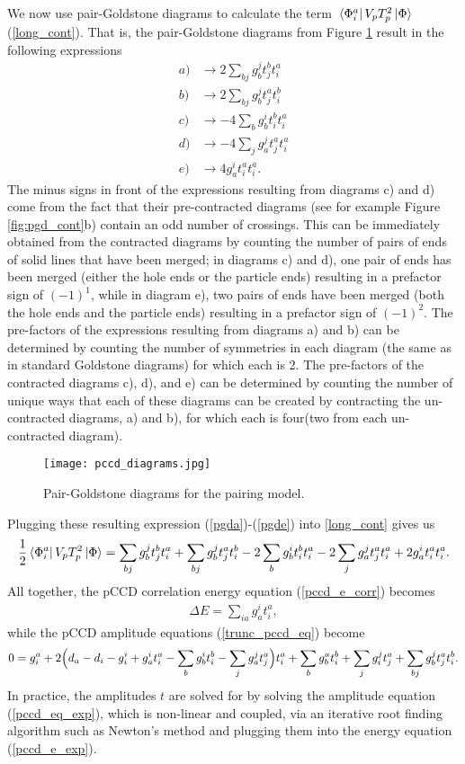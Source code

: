 \documentclass[Dual]{msu-thesis}
\begin{document}
We now use pair-Goldstone diagrams to calculate the term $\bra*{\Phi^a_i}V_pT^2_p\ket{\Phi}$ (\ref{long_cont}). That is, the pair-Goldstone diagrams from Figure \ref{fig:pgd} result in the following expressions
\begin{align}
\label{pgda}
a) &\to  2\sum_{bj}g^j_bt^b_jt^a_i
\\
b) &\to  2\sum_{bj}g^j_bt^a_jt^b_i
\\
c) &\to -4\sum_{b}g^i_bt^b_it^a_i
\\
d) &\to -4\sum_{j}g^j_at^a_jt^a_i
\\
\label{pgde}
e) &\to  4g^i_at^a_it^a_i
.\end{align}
The minus signs in front of the expressions resulting from diagrams c) and d) come from the fact that their pre-contracted diagrams (see for example Figure \ref{fig:pgd_cont}b) contain an odd number of crossings. This can be immediately obtained from the contracted diagrams by counting the number of pairs of ends of solid lines that have been merged; in diagrams c) and d), one pair of ends has been merged (either the hole ends or the particle ends) resulting in a prefactor sign of $(-1)^1$, while in diagram e), two pairs of ends have been merged (both the hole ends and the particle ends) resulting in a prefactor sign of $(-1)^2$. The pre-factors of the expressions resulting from diagrams a) and b) can be determined by counting the number of symmetries in each diagram (the same as in standard Goldstone diagrams) for which each is 2. The pre-factors of the contracted diagrams c), d), and e) can be determined by counting the number of unique ways that each of these diagrams can be created by contracting the un-contracted diagrams, a) and b), for which each is four(two from each un-contracted diagram).

\begin{figure}[t]
    \centering
    \texttt{[image: pccd\_diagrams.jpg]}
    \caption{Pair-Goldstone diagrams for the pairing model.}
    \label{fig:pgd}
\end{figure}

Plugging these resulting expression (\ref{pgda})-(\ref{pgde}) into \ref{long_cont} gives us
\begin{align}
\frac{1}{2}\bra*{\Phi_i^a}V_pT_p^2\ket{\Phi}
=
\sum_{bj}g^j_bt^b_jt^a_i
+\sum_{bj}g^j_bt^a_jt^b_i
-2\sum_{b}g^i_bt^b_it^a_i
-2\sum_{j}g^j_at^a_jt^a_i
+2g^i_at^a_it^a_i
.\end{align}
All together, the pCCD correlation energy equation (\ref{pccd_e_corr}) becomes
\begin{align}
\label{pccd_e_exp}
\Delta E=\sum_{ia}g_a^it_i^a
,\end{align}
while the pCCD amplitude equations (\ref{trunc_pccd_eq}) become
\begin{align}
\label{pccd_eq_exp}
0=g^a_i+2\Big{(}d_a-d_i-g^i_i+g^i_at^a_i-\sum_bg^i_bt^b_i-\sum_jg^j_at^a_j\Big{)}t^a_i+\sum_bg^a_bt^b_i+\sum_jg^j_it^a_j+\sum_{bj}g^j_bt^a_jt^b_i
.\end{align}
In practice, the amplitudes $t$ are solved for by solving the amplitude equation (\ref{pccd_eq_exp}), which is non-linear and coupled, via an iterative root finding algorithm such as Newton's method and plugging them into the energy equation (\ref{pccd_e_exp}).
\end{document}
